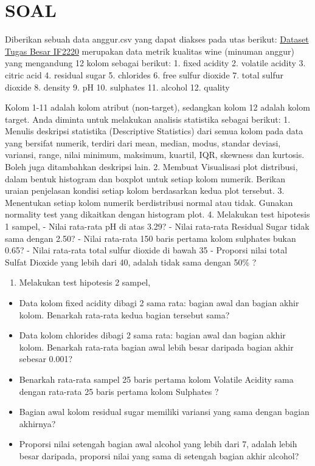 \documentclass[11pt]{article}
\providecommand{\tightlist}{%
      \setlength{\itemsep}{0pt}\setlength{\parskip}{0pt}}
\begin{document}
    \hypertarget{soal}{%
\section{SOAL}\label{soal}}

    Diberikan sebuah data anggur.csv yang dapat diakses pada utas berikut:
\href{https://github.com/MHEN2606/Tubes-IF2220-Probabilitas-dan-Statistika/blob/main/anggur.csv}{Dataset
Tugas Besar IF2220} merupakan data metrik kualitas wine (minuman anggur)
yang mengandung 12 kolom sebagai berikut: 1. fixed acidity 2. volatile
acidity 3. citric acid 4. residual sugar 5. chlorides 6. free sulfur
dioxide 7. total sulfur dioxide 8. density 9. pH 10. sulphates 11.
alcohol 12. quality

Kolom 1-11 adalah kolom atribut (non-target), sedangkan kolom 12 adalah
kolom target. Anda diminta untuk melakukan analisis statistika sebagai
berikut: 1. Menulis deskripsi statistika (Descriptive Statistics) dari
semua kolom pada data yang bersifat numerik, terdiri dari mean, median,
modus, standar deviasi, variansi, range, nilai minimum, maksimum,
kuartil, IQR, skewness dan kurtosis. Boleh juga ditambahkan deskripsi
lain. 2. Membuat Visualisasi plot distribusi, dalam bentuk histogram dan
boxplot untuk setiap kolom numerik. Berikan uraian penjelasan kondisi
setiap kolom berdasarkan kedua plot tersebut. 3. Menentukan setiap kolom
numerik berdistribusi normal atau tidak. Gunakan normality test yang
dikaitkan dengan histogram plot. 4. Melakukan test hipotesis 1 sampel, -
Nilai rata-rata pH di atas 3.29? - Nilai rata-rata Residual Sugar tidak
sama dengan 2.50? - Nilai rata-rata 150 baris pertama kolom sulphates
bukan 0.65? - Nilai rata-rata total sulfur dioxide di bawah 35 -
Proporsi nilai total Sulfat Dioxide yang lebih dari 40, adalah tidak
sama dengan 50\% ?

\begin{enumerate}
\def\labelenumi{\arabic{enumi}.}
\setcounter{enumi}{4}
\tightlist
\item
  Melakukan test hipotesis 2 sampel,
\end{enumerate}

\begin{itemize}
\tightlist
\item
  Data kolom fixed acidity dibagi 2 sama rata: bagian awal dan bagian
  akhir kolom. Benarkah rata-rata kedua bagian tersebut sama?
\item
  Data kolom chlorides dibagi 2 sama rata: bagian awal dan bagian akhir
  kolom. Benarkah rata-rata bagian awal lebih besar daripada bagian
  akhir sebesar 0.001?
\item
  Benarkah rata-rata sampel 25 baris pertama kolom Volatile Acidity sama
  dengan rata-rata 25 baris pertama kolom Sulphates ?
\item
  Bagian awal kolom residual sugar memiliki variansi yang sama dengan
  bagian akhirnya?
\item
  Proporsi nilai setengah bagian awal alcohol yang lebih dari 7, adalah
  lebih besar daripada, proporsi nilai yang sama di setengah bagian
  akhir alcohol?
\end{itemize}
\end{document}
